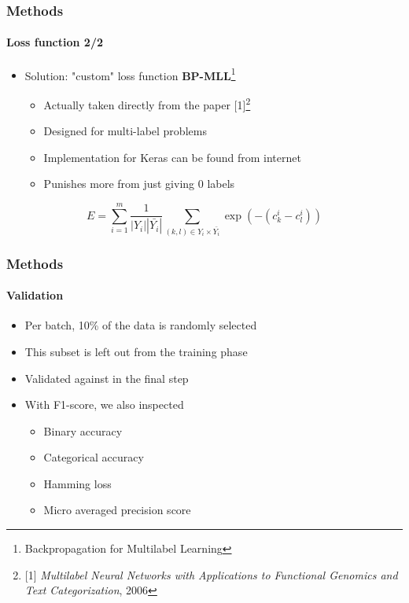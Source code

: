 \begin{frame}
	\frametitle{Methods}
	\framesubtitle{Loss function 2/2}
	\begin{itemize}
				\item Solution: "custom" loss function \textbf{BP-MLL}\footnote{Backpropagation for Multilabel Learning}
		\begin{itemize}
			\item Actually taken directly from the paper [1]\footnote{[1] \emph{Multilabel Neural Networks with Applications to Functional Genomics and Text Categorization}, 2006}
			\item Designed for multi-label problems
			\item Implementation for Keras can be found from internet
			\item Punishes more from just giving 0 labels
		\end{itemize}
	\end{itemize}
	\begin{block}{}
			$$ E =  \sum_{i=1}^{m} \dfrac{1}{|Y_i||\bar{Y_i}|} \sum_{(k,l) \in Y_i \times \bar{Y_i}} \exp(-(c_k^i -c_l^i))$$
	\end{block}	
\end{frame}

\begin{frame}
	\frametitle{Methods}
	\framesubtitle{Validation}
	\begin{itemize}
		\item Per batch, 10\% of the data is randomly selected
		\item This subset is left out from the training phase
		\item Validated against in the final step
		\item With F1-score, we also inspected
		\begin{itemize}
			\item Binary accuracy
			\item Categorical accuracy
			\item Hamming loss
			\item Micro averaged precision score
		\end{itemize}
	\end{itemize}
\end{frame}